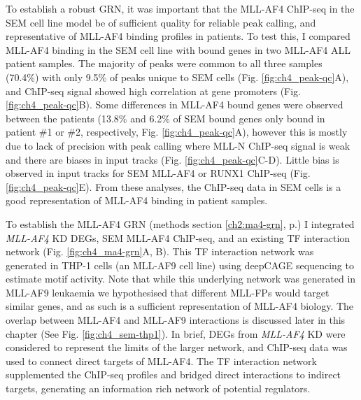 To establish a robust GRN, it was important that the MLL-AF4 ChIP-seq in the SEM cell line model be of sufficient quality for reliable peak calling, and representative of MLL-AF4 binding profiles in patients. To test this, I compared MLL-AF4 binding in the SEM cell line with bound genes in two MLL-AF4 ALL patient samples. The majority of peaks were common to all three samples (70.4\%) with only 9.5\% of peaks unique to SEM cells (Fig. \ref{fig:ch4_peak-qc}A), and ChIP-seq signal showed high correlation at gene promoters (Fig. \ref{fig:ch4_peak-qc}B). Some differences in MLL-AF4 bound genes were observed between the patients (13.8\% and 6.2\% of SEM bound genes only bound in patient \#1 or \#2, respectively, Fig. \ref{fig:ch4_peak-qc}A), however this is mostly due to lack of precision with peak calling where MLL-N ChIP-seq signal is weak and there are biases in input tracks (Fig. \ref{fig:ch4_peak-qc}C-D). Little bias is observed in input tracks for SEM MLL-AF4 or RUNX1 ChIP-seq (Fig. \ref{fig:ch4_peak-qc}E). From these analyses, the ChIP-seq data in SEM cells is a good representation of MLL-AF4 binding in patient samples.

To establish the MLL-AF4 GRN (methods section \ref{ch2:ma4-grn}, p.\pageref{ch2:ma4-grn}) I integrated \textit{MLL-AF4} KD DEGs, SEM MLL-AF4 ChIP-seq, and an existing TF interaction network \citep{the_fantom_consortium_and_the_riken_omics_science_center_transcriptional_2009} (Fig. \ref{fig:ch4_ma4-grn}A, B). This TF interaction network was generated in THP-1 cells (an MLL-AF9 cell line) using deepCAGE sequencing to estimate motif activity. Note that while this underlying network was generated in MLL-AF9 leukaemia we hypothesised that different MLL-FPs would target similar genes, and as such is a sufficient representation of MLL-AF4 biology. The overlap between MLL-AF4 and MLL-AF9 interactions is discussed later in this chapter (See Fig. \ref{fig:ch4_sem-thp1}). In brief, DEGs from \textit{MLL-AF4} KD were considered to represent the limits of the larger network, and ChIP-seq data was used to connect direct targets of MLL-AF4. The TF interaction network supplemented the ChIP-seq profiles and bridged direct interactions to indirect targets, generating an information rich network of potential regulators. 

